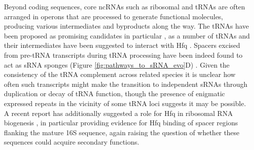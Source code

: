 Beyond coding sequences, core ncRNAs such as ribosomal and tRNAs are often arranged in operons that are processed to generate functional molecules, producing various intermediates and byproducts along the way. The tRNAs have been proposed as promising candidates in particular \citep{Gottesman2011-cq}, as a number of tRNAs and their intermediates have been suggested to interact with Hfq \citep{Lee2008-ti,Zhang2003-pm}. Spacers excised from pre-tRNA transcripts during tRNA processing have been indeed found to act as sRNA sponges (Figure \ref{fig:pathways_to_sRNA_evo}D) \citep{Lalaouna2015-al}. Given the consistency of the tRNA complement across related species \citep{Marck2002-bm} it is unclear how often such transcripts might make the transition to independent sRNAs through duplication or decay of tRNA function, though the presence of enigmatic expressed repeats in the vicinity of some tRNA loci \citep{Bosl1991-nm} suggests it may be possible. A recent report has additionally suggested a role for Hfq in ribosomal RNA biogenesis \citep{Andrade2018-fs}, in particular providing evidence for Hfq binding of spacer regions flanking the mature 16S sequence, again raising the question of whether these sequences could acquire secondary functions.\par 


